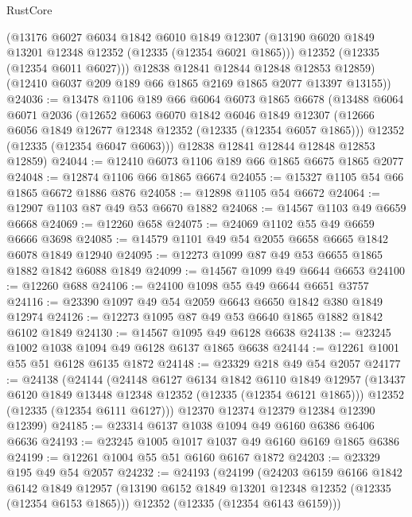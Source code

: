 \begin{lexlean}{RustCore}
\begin{coremodule}
        (@13176
          @6027
          @6034
          @1842
          @6010
          @1849
          @12307
          (@13190 @6020 @1849 @13201 @12348 @12352 (@12335 (@12354 @6021 @1865)))
          @12352
          (@12335 (@12354 @6011 @6027)))
        @12838
        @12841
        @12844
        @12848
        @12853
        @12859)
      (@12410 @6037 @209 @189 @66 @1865 @2169 @1865 @2077 @13397 @13155))
@24036 := @13478
    @1106
    @189
    @66
    @6064
    @6073
    @1865
    @6678
    (@13488
      @6064
      @6071
      @2036
      (@12652
        @6063
        @6070
        @1842
        @6046
        @1849
        @12307
        (@12666 @6056 @1849 @12677 @12348 @12352 (@12335 (@12354 @6057 @1865)))
        @12352
        (@12335 (@12354 @6047 @6063)))
      @12838
      @12841
      @12844
      @12848
      @12853
      @12859)
@24044 := @12410 @6073 @1106 @189 @66 @1865 @6675 @1865 @2077
@24048 := @12874 @1106 @66 @1865 @6674
@24055 := @15327 @1105 @54 @66 @1865 @6672 @1886 @876
@24058 := @12898 @1105 @54 @6672
@24064 := @12907 @1103 @87 @49 @53 @6670 @1882
@24068 := @14567 @1103 @49 @6659 @6668
@24069 := @12260 @658
@24075 := @24069 @1102 @55 @49 @6659 @6666 @3698
@24085 := @14579 @1101 @49 @54 @2055 @6658 @6665 @1842 @6078 @1849 @12940
@24095 := @12273 @1099 @87 @49 @53 @6655 @1865 @1882 @1842 @6088 @1849
@24099 := @14567 @1099 @49 @6644 @6653
@24100 := @12260 @688
@24106 := @24100 @1098 @55 @49 @6644 @6651 @3757
@24116 := @23390 @1097 @49 @54 @2059 @6643 @6650 @1842 @380 @1849 @12974
@24126 := @12273 @1095 @87 @49 @53 @6640 @1865 @1882 @1842 @6102 @1849
@24130 := @14567 @1095 @49 @6128 @6638
@24138 := @23245 @1002 @1038 @1094 @49 @6128 @6137 @1865 @6638
@24144 := @12261 @1001 @55 @51 @6128 @6135 @1872
@24148 := @23329 @218 @49 @54 @2057
@24177 := @24138
    (@24144
      (@24148
        @6127
        @6134
        @1842
        @6110
        @1849
        @12957
        (@13437 @6120 @1849 @13448 @12348 @12352 (@12335 (@12354 @6121 @1865)))
        @12352
        (@12335 (@12354 @6111 @6127)))
      @12370
      @12374
      @12379
      @12384
      @12390
      @12399)
@24185 := @23314 @6137 @1038 @1094 @49 @6160 @6386 @6406 @6636
@24193 := @23245 @1005 @1017 @1037 @49 @6160 @6169 @1865 @6386
@24199 := @12261 @1004 @55 @51 @6160 @6167 @1872
@24203 := @23329 @195 @49 @54 @2057
@24232 := @24193
    (@24199
      (@24203
        @6159
        @6166
        @1842
        @6142
        @1849
        @12957
        (@13190 @6152 @1849 @13201 @12348 @12352 (@12335 (@12354 @6153 @1865)))
        @12352
        (@12335 (@12354 @6143 @6159)))

\end{coremodule}
\end{lexlean}
